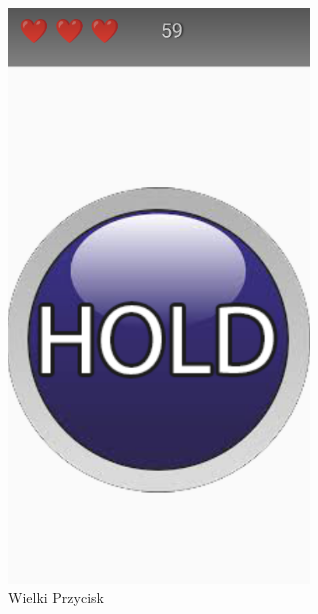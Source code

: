 	\begin{figure}[!htb]
	\begin{center}
		\includegraphics[width=8cm]{rys/gra666.png}
		\caption{Wielki Przycisk}
		\label{rys:rysunek001}
	\end{center}
\end{figure}
